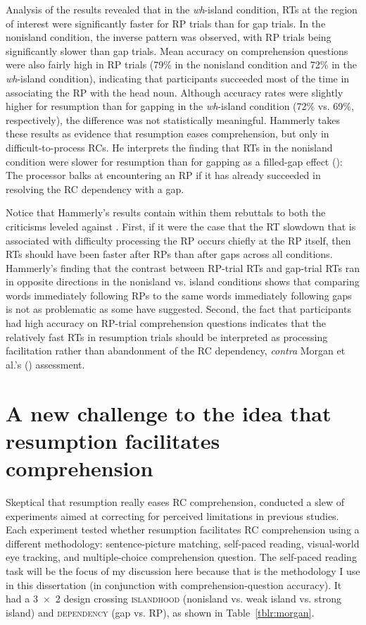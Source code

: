 Analysis of the results revealed that in the \textit{wh}-island condition, RTs at the region of interest were significantly faster for RP trials than for gap trials. In the nonisland condition, the inverse pattern was observed, with RP trials being significantly slower than gap trials. Mean accuracy on comprehension questions were also fairly high in RP trials (79\% in the nonisland condition and 72\% in the \textit{wh}-island condition), indicating that participants succeeded most of the time in associating the RP with the head noun. Although accuracy rates were slightly higher for resumption than for gapping in the \textit{wh}-island condition (72\% vs. 69\%, respectively), the difference was not statistically meaningful. Hammerly takes these results as evidence that resumption eases comprehension, but only in difficult-to-process RCs. He interprets the finding that RTs in the nonisland condition were slower for resumption than for gapping as a filled-gap effect (\cite{crain.fodor1985,stowe1986}): The processor balks at encountering an RP if it has already succeeded in resolving the RC dependency with a gap. 

Notice that Hammerly's results contain within them rebuttals to both the criticisms leveled against \textcite{hofmeister.norcliffe2013}. First, if it were the case that the RT slowdown that is associated with difficulty processing the RP occurs chiefly at the RP itself, then RTs should have been faster after RPs than after gaps across all conditions. Hammerly's finding that the contrast between RP-trial RTs and gap-trial RTs ran in opposite directions in the nonisland vs. island conditions shows that comparing words immediately following RPs to the same words immediately following gaps is not as problematic as some have suggested. Second, the fact that participants had high accuracy on RP-trial comprehension questions indicates that the relatively fast RTs in resumption trials should be interpreted as processing facilitation rather than abandonment of the RC dependency, \textit{contra} Morgan et al.'s (\citeyear{morgan.etal2020}) assessment.

\section{A new challenge to the idea that resumption facilitates comprehension}\label{res-morgan}

Skeptical that resumption really eases RC comprehension, \textcite{morgan.etal2020} conducted a slew of experiments aimed at correcting for perceived limitations in previous studies. Each experiment tested whether resumption facilitates RC comprehension using a different methodology: sentence-picture matching, self-paced reading, visual-world eye tracking, and multiple-choice comprehension question.\footnotemark{} The self-paced reading task will be the focus of my discussion here because that is the methodology I use in this dissertation (in conjunction with comprehension-question accuracy). It had a 3~×~2 design crossing \textsc{islandhood} (nonisland vs. weak island vs. strong island) and \textsc{dependency} (gap vs. RP), as shown in Table~\ref{tblr:morgan}.


